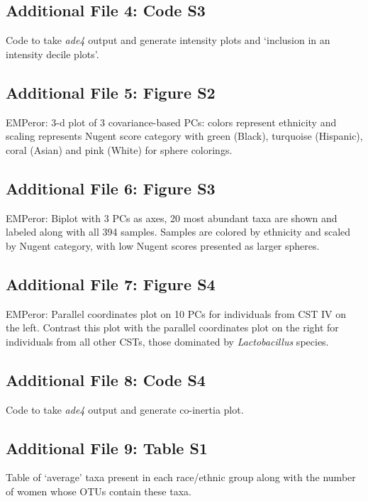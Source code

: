 \documentclass[doublespacing]{bmcart}
\begin{document}
\begin{backmatter}
\subsection*{Additional File 4: Code S3} Code to take {\it ade4} output and generate intensity plots and `inclusion in an intensity decile plots'.


\subsection*{Additional File 5: Figure S2}
EMPeror: 3-d plot of 3 covariance-based PCs: colors represent ethnicity and scaling represents Nugent score category with green (Black), turquoise (Hispanic), coral (Asian) and pink (White) for sphere colorings.

\subsection*{Additional File 6: Figure S3}
EMPeror: Biplot with 3 PCs as axes,  20 most abundant taxa are shown and labeled along with all 394 samples.  Samples are colored by ethnicity and scaled by Nugent category, with low Nugent scores presented as larger spheres. 

\subsection*{Additional File 7: Figure S4}
EMPeror: Parallel coordinates plot on 10 PCs for individuals from CST IV on the left. Contrast this plot with the parallel coordinates plot on the right for individuals from all other CSTs, those dominated by \textit{Lactobacillus} species.

\subsection*{Additional File 8: Code S4} Code to take {\it ade4} output and generate co-inertia plot.

\subsection*{Additional File 9: Table S1}  Table of `average' taxa present in each race/ethnic group along with the number of women whose OTUs contain these taxa.




\end{backmatter}
\end{document}
